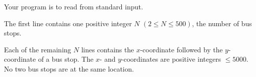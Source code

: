 Your program is to read from standard input. 

The first line contains one positive integer $N$ $(2 \le N \le 500)$, the number of bus stops. 

Each of the remaining $N$ lines contains the $x$-coordinate followed by the $y$-coordinate of a bus stop. The $x$- and $y$-coordinates are positive integers $\le 5000$. No two bus stops are at the same location.